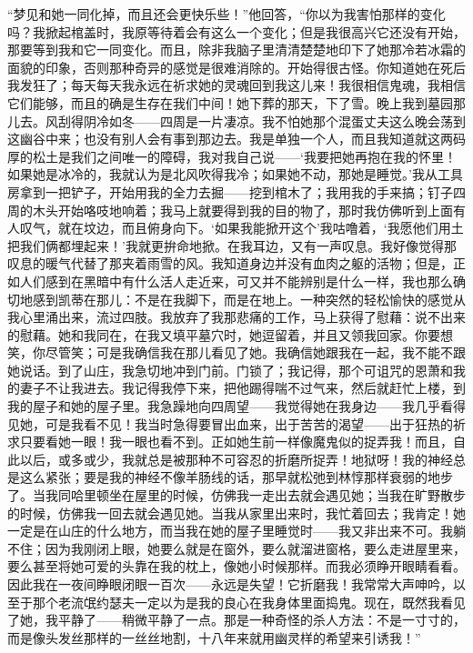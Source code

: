 \par “梦见和她一同化掉，而且还会更快乐些！”他回答，“你以为我害怕那样的变化吗？我掀起棺盖时，我原等待着会有这么一个变化；但是我很高兴它还没有开始，那要等到我和它一同变化。而且，除非我脑子里清清楚楚地印下了她那冷若冰霜的面貌的印象，否则那种奇异的感觉是很难消除的。开始得很古怪。你知道她在死后我发狂了；每天每天我永远在祈求她的灵魂回到我这儿来！我很相信鬼魂，我相信它们能够，而且的确是生存在我们中间！她下葬的那天，下了雪。晚上我到墓园那儿去。风刮得阴冷如冬——四周是一片凄凉。我不怕她那个混蛋丈夫这么晚会荡到这幽谷中来；也没有别人会有事到那边去。我是单独一个人，而且我知道就这两码厚的松土是我们之间唯一的障碍，我对我自己说——‘我要把她再抱在我的怀里！如果她是冰冷的，我就认为是北风吹得我冷；如果她不动，那她是睡觉。’我从工具房拿到一把铲子，开始用我的全力去掘——挖到棺木了；我用我的手来搞；钉子四周的木头开始咯吱地响着；我马上就要得到我的目的物了，那时我仿佛听到上面有人叹气，就在坟边，而且俯身向下。‘如果我能掀开这个’我咕噜着，‘我愿他们用土把我们俩都埋起来！’我就更拚命地掀。在我耳边，又有一声叹息。我好像觉得那叹息的暖气代替了那夹着雨雪的风。我知道身边并没有血肉之躯的活物；但是，正如人们感到在黑暗中有什么活人走近来，可又并不能辨别是什么一样，我也那么确切地感到凯蒂在那儿：不是在我脚下，而是在地上。一种突然的轻松愉快的感觉从我心里涌出来，流过四肢。我放弃了我那悲痛的工作，马上获得了慰藉：说不出来的慰藉。她和我同在，在我又填平墓穴时，她逗留着，并且又领我回家。你要想笑，你尽管笑；可是我确信我在那儿看见了她。我确信她跟我在一起，我不能不跟她说话。到了山庄，我急切地冲到门前。门锁了；我记得，那个可诅咒的恩萧和我的妻子不让我进去。我记得我停下来，把他踢得喘不过气来，然后就赶忙上楼，到我的屋子和她的屋子里。我急躁地向四周望——我觉得她在我身边——我几乎看得见她，可是我看不见！我当时急得要冒出血来，出于苦苦的渴望——出于狂热的祈求只要看她一眼！我一眼也看不到。正如她生前一样像魔鬼似的捉弄我！而且，自此以后，或多或少，我就总是被那种不可容忍的折磨所捉弄！地狱呀！我的神经总是这么紧张；要是我的神经不像羊肠线的话，那早就松弛到林惇那样衰弱的地步了。当我同哈里顿坐在屋里的时候，仿佛我一走出去就会遇见她；当我在旷野散步的时候，仿佛我一回去就会遇见她。当我从家里出来时，我忙着回去；我肯定！她一定是在山庄的什么地方，而当我在她的屋子里睡觉时——我又非出来不可。我躺不住；因为我刚闭上眼，她要么就是在窗外，要么就溜进窗格，要么走进屋里来，要么甚至将她可爱的头靠在我的枕上，像她小时候那样。而我必须睁开眼睛看看。因此我在一夜间睁眼闭眼一百次——永远是失望！它折磨我！我常常大声呻吟，以至于那个老流氓约瑟夫一定以为是我的良心在我身体里面捣鬼。现在，既然我看见了她，我平静了——稍微平静了一点。那是一种奇怪的杀人方法：不是一寸寸的，而是像头发丝那样的一丝丝地割，十八年来就用幽灵样的希望来引诱我！”

